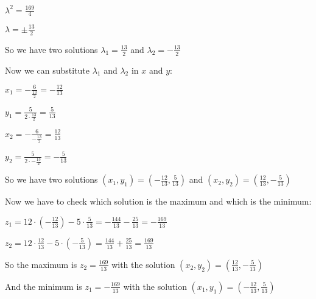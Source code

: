 \singlespacing

$\lambda^2 = \frac{169}{4}$

\singlespacing

$\lambda = \pm \frac{13}{2}$

\singlespacing

So we have two solutions $\lambda_1 = \frac{13}{2}$ and $\lambda_2 = -\frac{13}{2}$

\singlespacing

Now we can substitute $\lambda_1$ and $\lambda_2$ in $x$ and $y$:

\singlespacing

$x_1 = -\frac{6}{\frac{13}{2}} = -\frac{12}{13}$

\singlespacing

$y_1 = \frac{5}{2\cdot \frac{13}{2}} = \frac{5}{13}$

\singlespacing

$x_2 = -\frac{6}{-\frac{13}{2}} = \frac{12}{13}$

\singlespacing

$y_2 = \frac{5}{2\cdot -\frac{13}{2}} = -\frac{5}{13}$

\singlespacing

So we have two solutions $(x_1, y_1) = \left(-\frac{12}{13}, \frac{5}{13}\right)$ and $(x_2, y_2) = \left(\frac{12}{13}, -\frac{5}{13}\right)$

\singlespacing

Now we have to check which solution is the maximum and which is the minimum:

\singlespacing

$z_1 = 12\cdot \left(-\frac{12}{13}\right) - 5\cdot \frac{5}{13} = -\frac{144}{13} - \frac{25}{13} = -\frac{169}{13}$

\singlespacing

$z_2 = 12\cdot \frac{12}{13} - 5\cdot \left(-\frac{5}{13}\right) = \frac{144}{13} + \frac{25}{13} = \frac{169}{13}$

\singlespacing

So the maximum is $z_2 = \frac{169}{13}$ with the solution $(x_2, y_2) = \left(\frac{12}{13}, -\frac{5}{13}\right)$

\singlespacing

And the minimum is $z_1 = -\frac{169}{13}$ with the solution $(x_1, y_1) = \left(-\frac{12}{13}, \frac{5}{13}\right)$